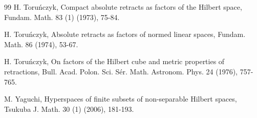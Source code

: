 \documentclass[12pt]{amsart}
\theoremstyle{definition}
\begin{document}
\begin{thebibliography}{99}
		 H. Toru\'nczyk,  Compact absolute retracts as factors of the Hilbert space, Fundam. Math.  83 (1) (1973), 75-84.
		
		 H. Toru\'nczyk,  Absolute retracts as factors of normed linear spaces, Fundam. Math.  86 (1974), 53-67.
		
		 H. Toru\'nczyk,  On factors of the Hilbert cube and metric properties of retractions, Bull. Acad. Polon. Sci. Sér. Math.
		Astronom. Phys. 24 (1976), 757-765. 
		
		 M. Yaguchi,  Hyperspaces of finite subsets of non-separable Hilbert spaces, Tsukuba J. Math.  30 (1) (2006), 181-193.
		
		
	\end{thebibliography}
	
	
\end{document}
